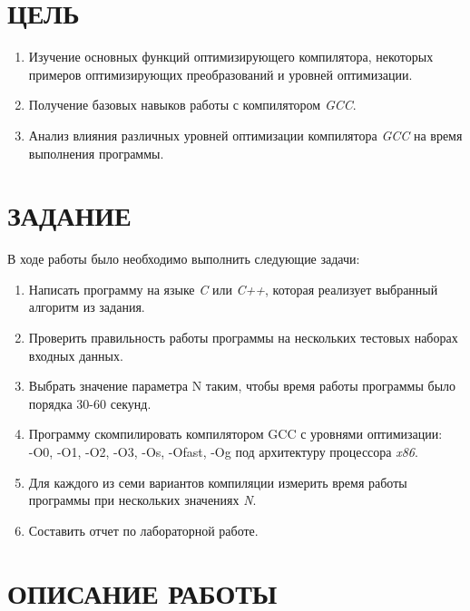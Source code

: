 \documentclass[12pt,a4paper]{article}
\numberwithin{subsection}{section}
\begin{document}
\tableofcontents

\newpage

\setcounter{page}{2}


\section{ЦЕЛЬ}
\begin{enumerate}
    \item Изучение основных функций оптимизирующего компилятора, некоторых примеров
     оптимизирующих преобразований и уровней оптимизации.
    \item Получение базовых навыков работы с компилятором \textit{GCC}.
    \item Анализ влияния различных уровней оптимизации компилятора \textit{GCC}
     на время выполнения программы.
\end{enumerate}


\section{ЗАДАНИЕ}
В ходе работы было необходимо выполнить следующие задачи:
\begin{enumerate}
    \item Написать программу на языке \textit{C} или \textit{C++}, которая реализует выбранный алгоритм из задания. 
    \item Проверить правильность работы программы на нескольких тестовых наборах входных данных. 
    \item Выбрать значение параметра N таким, чтобы время работы программы было порядка 30-60 секунд. 
    \item Программу скомпилировать компилятором GCC с уровнями оптимизации: \\
    -O0, -O1, -O2, -O3, -Os, -Ofast, -Og под архитектуру процессора \textit{x86}.
    \item Для каждого из семи вариантов компиляции измерить время работы программы при нескольких
    значениях \textit{N}. 
    \item Составить отчет по лабораторной работе.
\end{enumerate}

\newpage


\section{ОПИСАНИЕ РАБОТЫ}
\end{document}
